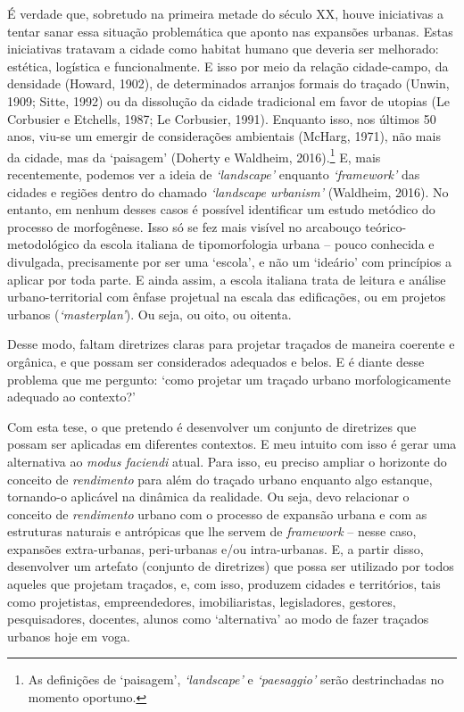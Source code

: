 \documentclass[12pt, a4paper]{book} %
\begin{document}
        É verdade que, sobretudo na primeira metade do século XX, houve iniciativas a tentar sanar essa situação problemática que aponto nas expansões urbanas. Estas iniciativas tratavam a cidade como habitat humano que deveria ser melhorado: estética, logística e funcionalmente. E isso por meio da relação cidade-campo, da densidade (Howard, 1902), de determinados arranjos formais do traçado (Unwin, 1909; Sitte, 1992) ou da dissolução da cidade tradicional em favor de utopias (Le Corbusier e Etchells, 1987; Le Corbusier, 1991). Enquanto isso, nos últimos 50 anos, viu-se um emergir de considerações ambientais (McHarg, 1971), não mais da cidade, mas da `paisagem' (Doherty e Waldheim, 2016).\footnote[5]{As definições de `paisagem', \textit{`landscape'} e \textit{`paesaggio'} serão destrinchadas no momento oportuno.} E, mais recentemente, podemos ver a ideia de \textit{`landscape'} enquanto \textit{`framework'} das cidades e regiões dentro do chamado \textit{`landscape urbanism'} (Waldheim, 2016). No entanto, em nenhum desses casos é possível identificar um estudo metódico do processo de morfogênese. Isso só se fez mais visível no arcabouço teórico-metodológico da escola italiana de tipomorfologia urbana – pouco conhecida e divulgada, precisamente por ser uma `escola', e não um `ideário' com princípios a aplicar por toda parte. E ainda assim, a escola italiana trata de leitura e análise urbano-territorial com ênfase projetual na escala das edificações, ou em projetos urbanos (\textit{`masterplan'}). Ou seja, ou oito, ou oitenta.
   
        Desse modo, faltam diretrizes claras para projetar traçados de maneira coerente e orgânica, e que possam ser considerados adequados e belos. E é diante desse problema que me pergunto: `como projetar um traçado urbano morfologicamente adequado ao contexto?' 

        Com esta tese, o que pretendo é desenvolver um conjunto de diretrizes que possam ser aplicadas em diferentes contextos. E meu intuito com isso é gerar uma alternativa ao \textit{modus faciendi} atual. Para isso, eu preciso ampliar o horizonte do conceito de \textit{rendimento} para além do traçado urbano enquanto algo estanque, tornando-o aplicável na dinâmica da realidade. Ou seja, devo relacionar o conceito de \textit{rendimento} urbano com o processo de expansão urbana e com as estruturas naturais e antrópicas que lhe servem de \textit{framework} – nesse caso, expansões extra-urbanas, peri-urbanas e/ou intra-urbanas. E, a partir disso, desenvolver um artefato (conjunto de diretrizes) que possa ser utilizado por todos aqueles que projetam traçados, e, com isso, produzem cidades e territórios, tais como projetistas, empreendedores, imobiliaristas, legisladores, gestores, pesquisadores, docentes, alunos como `alternativa' ao modo de fazer traçados urbanos hoje em voga.
\end{document}
